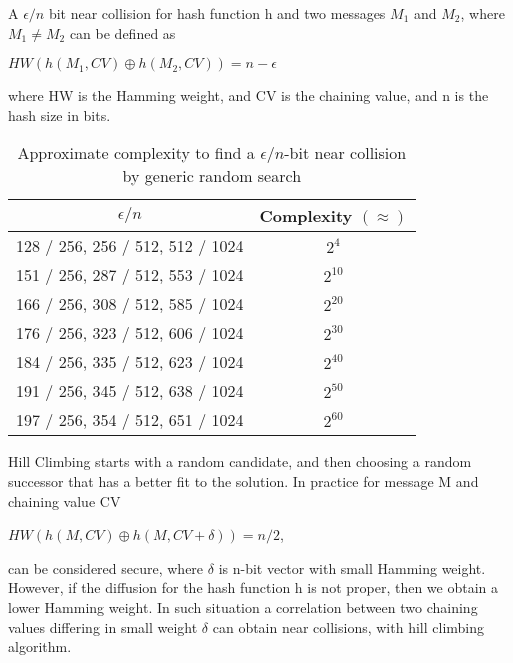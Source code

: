 A $\epsilon / n $ bit near collision for hash function h and two messages $M_{1}$ and $M_{2}$, where $M_{1} \neq M_{2}$ can be 
defined as
\begin{center}$HW( h( M_{1}, CV ) \oplus h( M_{2}, CV ) ) = n - \epsilon $\end{center}
where HW is the Hamming weight, and CV is the chaining value, and n is the hash size in bits.

\begin{table}[h]
  \begin{center}
    \begin{tabular}{ | c | c | } \hline
      $\epsilon / n $                         & Complexity $( \approx )$ \\ \hline
      128 / 256, 256 / 512, 512 / 1024 & $2^{4}$ \\ \hline
      151 / 256, 287 / 512, 553 / 1024 & $2^{10}$ \\ \hline
      166 / 256, 308 / 512, 585 / 1024 & $2^{20}$ \\ \hline
      176 / 256, 323 / 512, 606 / 1024 & $2^{30}$ \\ \hline
      184 / 256, 335 / 512, 623 / 1024 & $2^{40}$ \\ \hline
      191 / 256, 345 / 512, 638 / 1024 & $2^{50}$ \\ \hline
      197 / 256, 354 / 512, 651 / 1024 & $2^{60}$ \\ \hline
    \end{tabular}
    \caption{Approximate complexity to find a $\epsilon / n$-bit near collision by generic random search\cite{00029}}
  \end{center}
\end{table}

Hill Climbing starts with a random candidate, and then choosing a random successor that has a better fit to the
solution. In practice for message M and chaining value CV 
\begin{center}$HW( h(M, CV) \oplus h(M, CV + \delta) ) = n / 2 $,\end{center}
can be considered secure, where $\delta$ is n-bit vector with small Hamming weight. However, if the diffusion for the 
hash function h is not proper, then we obtain a lower Hamming weight. In such situation a correlation between two 
chaining values differing in small weight $\delta$ can obtain near collisions, with hill climbing algorithm.

